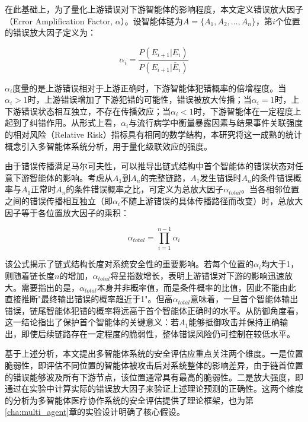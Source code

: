 在此基础上，为了量化上游错误对下游智能体的影响程度，本文定义错误放大因子（Error Amplification Factor, $\alpha$）。设智能体链为$A = \{A_1, A_2, \ldots, A_n\}$，第$i$个位置的错误放大因子定义为：

\begin{equation}
\alpha_i = \frac{P(E_{i+1} | E_i)}{P(E_{i+1} | \bar{E}_i)}
\label{eq:error_amplification}
\end{equation}

$\alpha_i$度量的是上游错误相对于上游正确时，下游智能体犯错概率的倍增程度。当$\alpha_i > 1$时，上游错误增加了下游犯错的可能性，错误被放大传播；当$\alpha_i = 1$时，上下游错误状态相互独立，不存在传播效应；当$\alpha_i < 1$时，下游智能体在一定程度上起到了纠错作用。从形式上看，$\alpha_i$与流行病学中衡量暴露因素与结果事件关联强度的相对风险（Relative Risk）指标\cite{rothman2008epidemiology}具有相同的数学结构，本研究将这一成熟的统计概念引入多智能体系统分析，用于量化级联效应的强度。

由于错误传播满足马尔可夫性，可以推导出链式结构中首个智能体的错误状态对任意下游智能体的影响。考虑从$A_1$到$A_n$的完整链路，$A_1$发生错误时$A_n$的条件错误概率与$A_1$正常时$A_n$的条件错误概率之比，可定义为总放大因子$\alpha_{total}$。当各相邻位置之间的错误传播相互独立（即$\alpha_i$不随上游错误的具体传播路径而改变）时，总放大因子等于各位置放大因子的乘积：

\begin{equation}
\alpha_{total} = \prod_{i=1}^{n-1} \alpha_i
\label{eq:total_amplification}
\end{equation}

该公式揭示了链式结构长度对系统安全性的重要影响。若每个位置的$\alpha_i$均大于1，则随着链长度$n$的增加，$\alpha_{total}$将呈指数增长，表明上游错误对下游的影响迅速放大。需要指出的是，$\alpha_{total}$本身并非概率值，而是条件概率的比值，因此不能由此直接推断"最终输出错误的概率趋近于1"。但高$\alpha_{total}$意味着，一旦首个智能体输出错误，链尾智能体犯错的概率将远高于首个智能体正确时的水平。从防御角度看，这一结论指出了保护首个智能体的关键意义：若$A_1$能够抵御攻击并保持正确输出，即使后续链路存在一定程度的脆弱性，整体错误风险仍可控制在较低水平。

基于上述分析，本文提出多智能体系统的安全评估应重点关注两个维度。一是位置脆弱性，即评估不同位置的智能体被攻击后对系统整体的影响差异，由于链首位置的错误能够波及所有下游节点，该位置通常具有最高的脆弱性。二是放大强度，即通过在实验中计算实际的错误放大因子来验证上述理论预测的正确性。这两个维度的分析为多智能体医疗协作系统的安全评估提供了理论框架，也为第\ref{cha:multi_agent}章的实验设计明确了核心假设。

